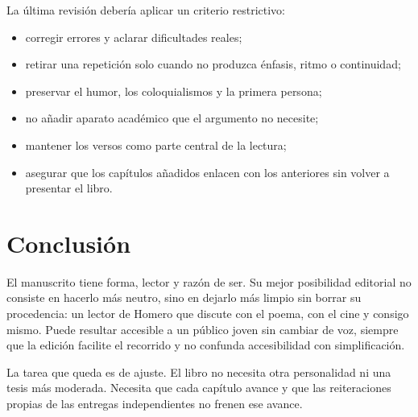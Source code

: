 \documentclass[12pt,a4paper]{article}
\begin{document}
La última revisión debería aplicar un criterio restrictivo:

\begin{itemize}
  \item corregir errores y aclarar dificultades reales;
  \item retirar una repetición solo cuando no produzca énfasis, ritmo o continuidad;
  \item preservar el humor, los coloquialismos y la primera persona;
  \item no añadir aparato académico que el argumento no necesite;
  \item mantener los versos como parte central de la lectura;
  \item asegurar que los capítulos añadidos enlacen con los anteriores sin volver a presentar el libro.
\end{itemize}

\section*{Conclusión}

El manuscrito tiene forma, lector y razón de ser. Su mejor posibilidad editorial no consiste en hacerlo más neutro, sino en dejarlo más limpio sin borrar su procedencia: un lector de Homero que discute con el poema, con el cine y consigo mismo. Puede resultar accesible a un público joven sin cambiar de voz, siempre que la edición facilite el recorrido y no confunda accesibilidad con simplificación.

La tarea que queda es de ajuste. El libro no necesita otra personalidad ni una tesis más moderada. Necesita que cada capítulo avance y que las reiteraciones propias de las entregas independientes no frenen ese avance.
\end{document}
